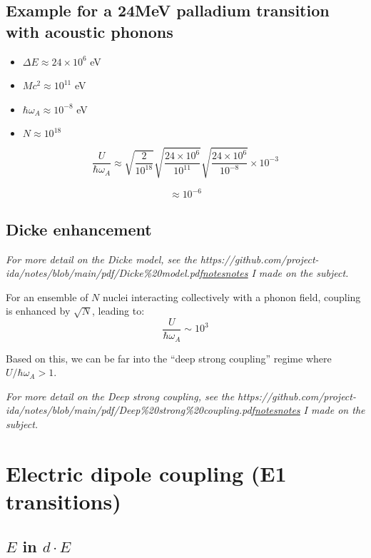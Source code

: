 \documentclass[
]{article}
\let\oldhref\href
\renewcommand{\href}[2]{\ifx#1\urlprefix\oldhref{#1}{#2}\else\uline{\oldhref{#1}{#2}}\fi}
\renewcommand{\[}{\begin{equation}}
\renewcommand{\]}{\end{equation}}
\providecommand{\tightlist}{%
  \setlength{\itemsep}{0pt}\setlength{\parskip}{0pt}}
\begin{document}
\subsection{Example for a 24MeV palladium transition with acoustic
phonons}\label{example-for-a-24mev-palladium-transition-with-acoustic-phonons}

\begin{itemize}
\tightlist
\item
  \(\Delta E \approx 24 \times 10^{6}\) eV\\
\item
  \(M c^2 \approx 10^{11}\) eV\\
\item
  \(\hbar \omega_A \approx 10^{-8}\) eV\\
\item
  \(N \approx 10^{18}\)
\end{itemize}

\[
\frac{U}{\hbar \omega_A} \approx \sqrt{\frac{2}{10^{18}}} \sqrt{\frac{24 \times 10^6}{10^{11}}} \sqrt{\frac{24 \times 10^6}{10^{-8}}} \times 10^{-3}
\]

\[
\approx 10^{-6}
\]

\subsection{Dicke enhancement}\label{dicke-enhancement}

\emph{For more detail on the Dicke model, see the
\href{https://github.com/project-ida/notes/blob/main/pdf/Dicke\%20model.pdf}{notes}
I made on the subject.}

For an ensemble of \(N\) nuclei interacting collectively with a phonon
field, coupling is enhanced by \(\sqrt{N}\), leading to: \[
\frac{U}{\hbar \omega_A} \sim 10^{3}
\]

Based on this, we can be far into the ``deep strong coupling'' regime
where \(U/\hbar \omega_A > 1\).

\emph{For more detail on the Deep strong coupling, see the
\href{https://github.com/project-ida/notes/blob/main/pdf/Deep\%20strong\%20coupling.pdf}{notes}
I made on the subject.}

\section{Electric dipole coupling (E1
transitions)}\label{electric-dipole-coupling-e1-transitions}

\subsection{\texorpdfstring{\(E\) in
\(d \cdot E\)}{E in d \textbackslash cdot E}}\label{e-in-d-cdot-e}
\end{document}
